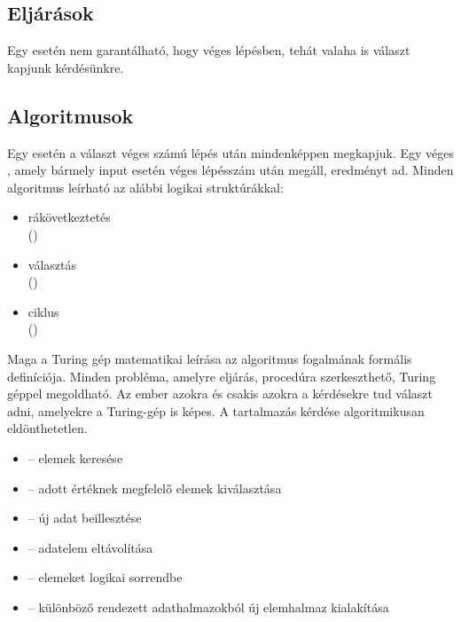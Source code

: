 \documentclass[../../main.tex]{subfiles}
\begin{document}
\subsection{Eljárások}

Egy  esetén nem garantálható, hogy véges lépésben,
tehát valaha is választ kapjunk kérdésünkre.

\subsection{Algoritmusok}

Egy  esetén a választ véges számú lépés után mindenképpen
megkapjuk. Egy véges , amely bármely input esetén
véges lépésszám után megáll, eredményt ad.
Minden algoritmus leírható az alábbi logikai struktúrákkal:
\begin{multicols}{3}
  \begin{itemize}
    \item rákövetkeztetés \\ ()
    \item választás \\ ()
    \item ciklus \\ ()
  \end{itemize}
\end{multicols}
Maga a Turing gép matematikai leírása az algoritmus fogalmának formális
definíciója. Minden probléma, amelyre eljárás, procedúra szerkeszthető,
Turing géppel megoldható. Az ember azokra és csakis azokra a kérdésekre
tud választ adni, amelyekre a Turing-gép is képes. A tartalmazás kérdése
algoritmikusan eldönthetetlen.
\begin{multicols}{2}
  \begin{itemize}
    \item {} – elemek keresése

    \item {} – adott értéknek megfelelő elemek kiválasztása

    \item {} – új adat beillesztése

    \item {} – adatelem eltávolítása

    \item {} – elemeket logikai sorrendbe

    \item {} – különböző rendezett
          adathalmazokból új elemhalmaz kialakítása
  \end{itemize}
\end{multicols}
\end{document}
